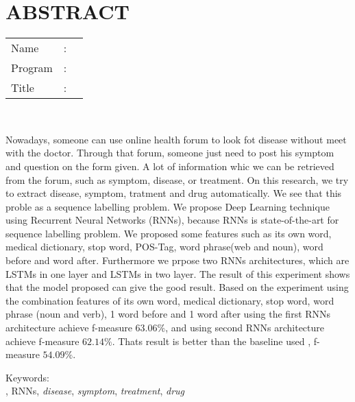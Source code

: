 %
%
%

\chapter*{ABSTRACT}

\vspace*{0.2cm}

\noindent \begin{tabular}{l l p{11.0cm}}
	Name&: & \penulis \\
	Program&: & \programEng \\
	Title&: & \judulInggris \\
\end{tabular} \\ 

\vspace*{0.5cm}

\noindent 

Nowadays, someone can use online health forum to look fot disease without meet with the doctor. Through that forum, someone just need to post his symptom and question on the form given. A lot of information whic we can be retrieved from the forum, such as symptom, disease, or treatment. On this research, we try to extract disease, symptom, tratment and drug automatically. We see that this proble as a sequence labelling problem. We propose Deep Learning technique using Recurrent Neural Networks (RNNs), because RNNs is state-of-the-art for sequence labelling problem. We proposed some features such as its own word, medical dictionary, stop word, POS-Tag, word phrase(web and noun), word before and word after. Furthermore  we prpose two RNNs architectures, which are LSTMs in one layer and LSTMs in two layer. The result of this experiment shows that the model proposed can give the good result. Based on the experiment using the combination features of its own word, medical dictionary, stop word, word phrase (noun and verb), 1 word before and 1 word after  using the first RNNs architecture achieve f-measure $ 63.06\% $, and using second RNNs architecture achieve f-measure $ 62.14\% $. Thats result is better than the baseline used \citep{skripsiKakRadit}, f-measure $ 54.09\% $.


\vspace*{0.2cm}

\noindent Keywords: \\ 
\noindent \mer, RNNs, \textit{disease}, \textit{symptom}, \textit{treatment}, \textit{drug} \\ 

\newpage